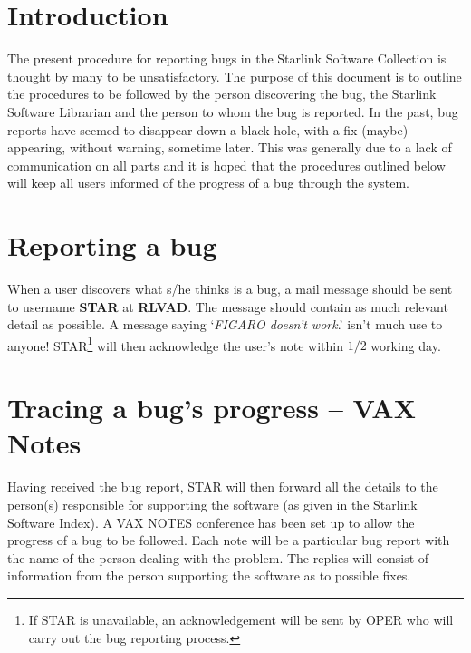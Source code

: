 \documentclass[twoside,11pt,nolof,noabs]{starlink}
\begin{document}
\scfrontmatter

\section{Introduction}
The present procedure for reporting bugs in the Starlink Software Collection is
thought by many to be unsatisfactory. The purpose of this document is to outline
the procedures to be followed by the person discovering the bug, the Starlink
Software Librarian and the person to whom the bug is reported. In the past,
bug reports have seemed to disappear down a black hole, with a fix (maybe)
appearing, without warning, sometime later. This was generally due to a lack of
communication on all parts and it is hoped that the procedures outlined below
will keep all users informed of the progress of a bug through the system.

\section{Reporting a bug}
When a user discovers what s/he thinks is a bug, a mail message should be
sent to username \textbf{STAR} at \textbf{RLVAD}. The message should contain as much
relevant detail as possible. A message saying `\emph{FIGARO doesn't work}.'
isn't much use to anyone! STAR\footnote[1]{If STAR is unavailable, an
acknowledgement will be sent by OPER who will carry out the bug reporting
process.} will then acknowledge the user's note within $1/2$ working day.

\section{Tracing a bug's progress -- VAX Notes}
Having received the bug report, STAR will then forward all the details to the
person(s) responsible for supporting the software (as given in the Starlink
Software Index). A VAX NOTES conference has been set up to allow the
progress of a bug to be followed. Each note will be a particular
bug report
with the name of the person dealing with the problem. The replies will consist
of information from the person supporting the software as to possible fixes.
\end{document}
